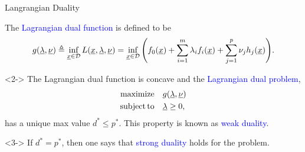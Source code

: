 \documentclass[10pt,english,hide notes,aspectratio=169]{beamer}
\begin{document}
\begin{frame}{Langrangian Duality}

\begin{definition}
The \textcolor{blue}{Lagrangian dual function} is defined to be \vspace{-1.5mm}
\[ g(\underline{\lambda},\underline{\nu}) \triangleq \inf_{\underline{x}\in \mathcal{D}} L(\underline{x},\underline{\lambda},\underline{\nu}) = \inf_{\underline{x}\in \mathcal{D}} \Bigg( f_0(\underline{x}) + \sum_{i=1}^m \lambda_i f_i(\underline{x}) + \sum_{j=1}^p \nu_j h_j(\underline{x}) \Bigg). \]
\end{definition}



\begin{lemma}<2->
The Lagrangian dual function is concave and the \textcolor{blue}{Lagrangian dual problem}, \vspace{-2.5mm}
\begin{align*}
\mathrm{maximize} \quad & g(\vecnot{\lambda},\vecnot{\nu}) \\
\mathrm{subject\,to} \quad & \vecnot{\lambda} \geq 0, \vspace{-1mm}
\end{align*}
has a unique max value $d^* \leq p^*$.
This property is known as \textcolor{blue}{weak duality}.
\end{lemma}

\begin{definition}<3->
If $d^* = p^*$, then one says that \textcolor{blue}{strong duality} holds for the problem.
\end{definition}


\end{frame}
\end{document}
